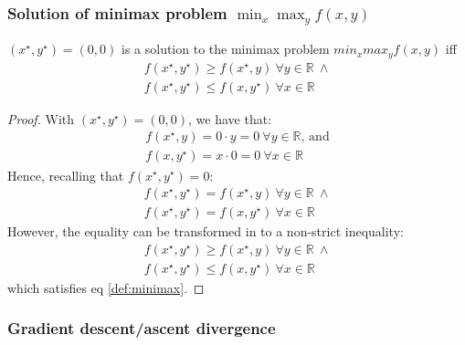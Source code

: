 \documentclass[12pt]{article}
\begin{document}
\subsubsection{Solution of minimax problem $\min_{x} \max_{y} f(x, y)$}

$ (x^{\star},y^{\star})=(0,0)$ is a solution to the minimax problem $min_x max_y f(x,y)$ iff
\begin{equation}
\begin{gathered} \label{def:minimax}
    f(x^{\star},y^{\star}) \geq f(x^{\star},y) \ \forall y \in \mathbb{R} \ \land
    \\ f(x^{\star},y^{\star}) \leq f(x,y^{\star}) \ \forall x \in \mathbb{R}
\end{gathered}
\end{equation}
\begin{proof}
With $(x^{\star}, y^{\star}) = (0, 0)$, we have that:
\begin{equation}
\begin{gathered}
    f(x^{\star}, y) = 0 \cdot y = 0 \ \forall y \in \mathbb{R} \text{, and} \\
    f(x, y^{\star}) = x \cdot 0 = 0 \ \forall x \in \mathbb{R}
\end{gathered}
\end{equation}
Hence, recalling that $f(x^{\star}, y^{\star}) = 0$:
\begin{equation}
\begin{gathered}
    f(x^{\star}, y^{\star}) = f(x^{\star}, y)  \ \forall y \in \mathbb{R} \ \land \\
    f(x^{\star}, y^{\star}) = f(x, y^{\star})  \ \forall x \in \mathbb{R}
\end{gathered}
\end{equation}
However, the equality can be transformed in to a non-strict inequality:
\begin{equation}
\begin{gathered}
    f(x^{\star}, y^{\star}) \geq f(x^{\star}, y)  \ \forall y \in \mathbb{R} \ \land \\
    f(x^{\star}, y^{\star}) \leq f(x, y^{\star})  \ \forall x \in \mathbb{R}
\end{gathered}
\end{equation}
which satisfies eq \eqref{def:minimax}.

\end{proof}

\subsubsection{Gradient descent/ascent divergence}
\end{document}

